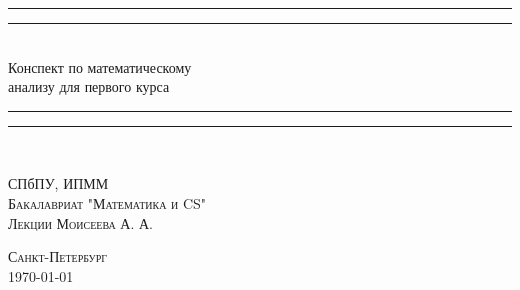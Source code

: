 \documentclass{article}
\begin{document}
\thispagestyle{empty}
\begin{center}
\rule[0.5ex]{\linewidth}{2pt}\vspace*{-\baselineskip}\vspace*{3.2pt}
\rule[0.5ex]{\linewidth}{1pt}\\[\baselineskip]
{\huge \sc Конспект по математическому}\\[4mm]
{\huge \sc анализу для первого курса}\\[4mm]
\rule[0.5ex]{\linewidth}{1pt}\vspace*{-\baselineskip}\vspace{3.2pt}
\rule[0.5ex]{\linewidth}{2pt}\\
\vspace{6.5mm}

\vspace{4mm}
{\large СПбПУ, ИПММ\\
\smallskip
\smallskip
\textsc{Бакалавриат "Математика и CS"}}\\

\vspace{6.5mm}
{\large\textsc{Лекции Моисеева А. А.}}\\
\vspace{5mm}

\vspace{20mm}

\end{center}
\author{Я}
\begin{center}
\vfill {\large\textsc{Санкт-Петербург}}\\
 \today
\end{center}

\newpage
\tableofcontents{}




\end{document}
